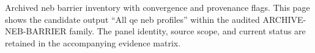 Archived neb barrier inventory with convergence and provenance flags. This page shows the candidate output ``All qe neb profiles'' within the audited ARCHIVE-NEB-BARRIER family. The panel identity, source scope, and current status are retained in the accompanying evidence matrix.
